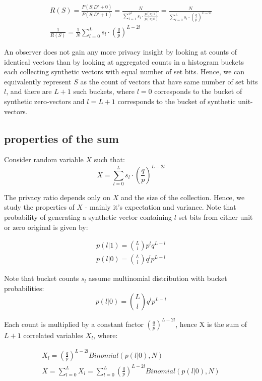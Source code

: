 \documentclass[11pt,draft]{article}
\begin{document}
\begin{align}
R(S) = \frac{P(S|D'+0)}{P(S|D'+1)} =  \frac{N}{ \sum_{i=1}^{2^L} s_i  \cdot \frac{p(v_i|1)}{p(v_i|0)} }  = \frac{N}{ \sum_{l=0}^{L} s_l \cdot  \left ( \frac{q}{p} \right )^ {L - 2l} } \\
\frac{1}{R(S)} = \frac{1}{N} \sum_{l=0}^{L} s_l \cdot  \left ( \frac{q}{p} \right )^ {L - 2l} 
\end{align}

An observer does not gain any more privacy insight by looking at counts of identical vectors than by looking at aggregated counts in a histogram buckets each collecting synthetic vectors with equal number of set bits.
Hence, we can equivalently represent $S$ as the count of vectors that have same number of set bits $l$, and there are $L+1$ such buckets, where $l=0$ corresponds to the bucket of synthetic zero-vectors and $l=L+1$ corresponds to the bucket of synthetic unit-vectors.

\subsection{properties of the sum}

Consider random variable $X$ such that:
\[
X = \sum_{l=0}^{L} s_l \cdot  \left ( \frac{q}{p} \right )^ {L - 2l} 
\]

The privacy ratio depends only on $X$ and the size of the collection.  Hence, we study the properties of $X$ - mainly it's expectation and variance.
Note that probability of generating a synthetic vector containing $l$ set bits from either unit or zero original is given by:

\begin{align}
 p(l|1) = \binom{L}{l} p^lq^{L-l} \\
 p(l|0) = \binom{L}{l} q^lp^{L-l}
\end{align}

Note that bucket counts $s_l$ assume multinomial distribution with bucket probabilities:
\[
 p(l|0) = \binom{L}{l} q^lp^{L-l}
 \]
 
Each count is multiplied by a constant factor $\left ( \frac{q}{p} \right )^ {L - 2l}$, hence X is the sum of $L+1$ correlated variables $X_l$, where:

\begin{align}
 X_l =    \left ( \frac{q}{p} \right )^ {L - 2l}  Binomial(p(l|0), N) \\
 X =  \sum_{l=0}^{L} X_l  =  \sum_{l=0}^{L}   \left ( \frac{q}{p} \right )^ {L - 2l}  Binomial(p(l|0), N)
\end{align} 
 
\end{document}

